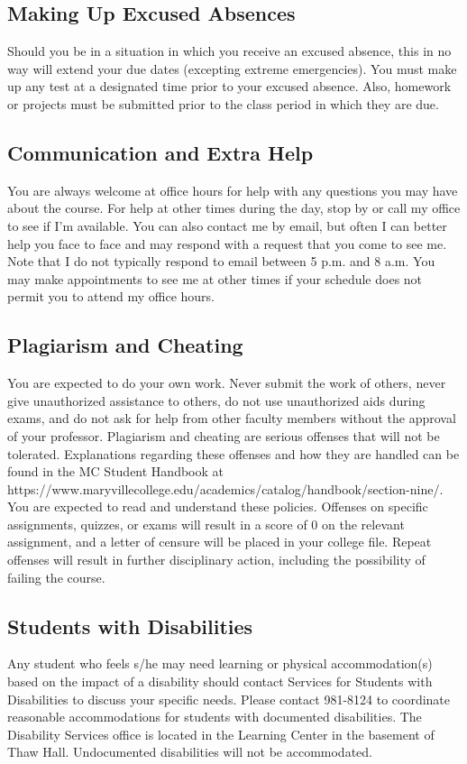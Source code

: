 \documentclass[11pt]{article}
\begin{document}
\subsection*{Making Up Excused Absences}
Should you be in a situation in which you receive an excused absence,
this in no way will extend your due dates (excepting extreme
emergencies). You must make up any test at a designated time 
prior to your excused absence. Also, homework or projects must
be submitted prior to the class period in which they are due.

\subsection*{Communication and Extra Help}
You are always welcome at office hours for help with any
questions you may have about the course. For help at other times during the day, stop by or call my office to see if I'm available. You can also contact me by email, but often I can better help you face to face and may respond with a request that
you come to see me. Note that I do not typically respond to email between 5 p.m. and 8 a.m. You may make appointments to see me at other times if your schedule does not permit you to attend my office hours.


\subsection*{Plagiarism and Cheating}
You are expected to do your own work. Never submit the work of others,
never give unauthorized assistance to others, do not use unauthorized
aids during exams, and do not ask for help from other
faculty members without the approval of your professor. Plagiarism and cheating are serious offenses that will not be
tolerated. Explanations regarding these offenses and how they are handled can be found in the MC Student Handbook at\newline
https://www.maryvillecollege.edu/academics/catalog/handbook/section-nine/.\newline
You are expected to read and understand these policies. Offenses on specific assignments, quizzes, or exams will result
in a score of 0 on the relevant assignment, and a letter of censure will be placed in your college file. Repeat offenses will
result in further disciplinary action, including the possibility of failing the course.

\subsection*{Students with Disabilities}
Any student who feels s/he may need learning or physical
accommodation(s) based on the impact of a disability should contact Services for Students with Disabilities to discuss your
specific needs. Please contact 981-8124 to coordinate reasonable accommodations for students with documented
disabilities. The Disability Services office is located in the Learning Center in the basement of Thaw Hall. Undocumented
disabilities will not be accommodated.
\end{document}
